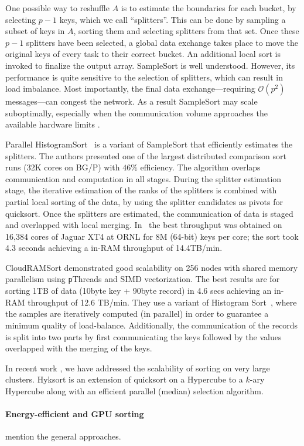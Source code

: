 One possible way to reshuffle $A$ is to estimate the boundaries for each bucket, by selecting $p-1$ keys, which we call
``splitters''. This can be done  by sampling a
subset of keys in $A$, sorting them and selecting splitters from that set. Once these $p-1$ splitters have been
selected, a global data exchange takes place to move the original keys of every task to their correct bucket.
An additional local sort is invoked to finalize the output array. SampleSort is well understood. However, its performance is quite sensitive to the selection of splitters, which can result in load imbalance. Most importantly, the final data exchange---requiring $\mathcal{O}(p^2)$ messages---can congest the network. As a result SampleSort may scale 
suboptimally, especially when the communication volume approaches the available hardware limits \cite{hyksort}.

Parallel HistogramSort~\cite{kale93,solomonik10} is
a variant of SampleSort that efficiently estimates the splitters. The authors presented
one of the largest distributed comparison sort runs (32K cores on
BG/P) with $46\%$ efficiency. The algorithm overlaps communication
and computation in all stages. During the splitter estimation
stage, the iterative estimation of the ranks of the splitters is
combined with partial local sorting of the data, by using the
splitter candidates as pivots for quicksort. Once the splitters
are estimated, the communication of data is staged and overlapped
with local merging. In~\cite{solomonik10} the best throughput was
obtained on 16,384 cores of Jaguar XT4 at ORNL for 8M (64-bit) keys
per core; the sort took 4.3 seconds achieving a in-RAM throughput of
14.4TB/min. 

CloudRAMSort \cite{kim12} demonstrated good scalability on 256 nodes with shared memory
parallelism using {\texttt pThreads} and SIMD vectorization. The
best results are for sorting 1TB of data (10byte key + 90byte
record) in 4.6 secs achieving an in-RAM throughput of 12.6 TB/min. They
use a variant of Histogram Sort~\cite{kale93}, where the
samples are iteratively computed (in parallel) in order to guarantee
a minimum quality of load-balance. Additionally, the communication of the records is split into two parts by first communicating the keys followed by the values overlapped with the merging of the keys. 

In recent work \cite{hyksort}, we have addressed the scalability of sorting on very large clusters. Hyksort\cite{hyksort} is an extension of quicksort on a Hypercube \cite{wagar87} to a $k$-ary Hypercube along with an efficient parallel (median) selection algorithm. 

\paragraph{Energy-efficient and GPU sorting}
mention the general approaches. 
